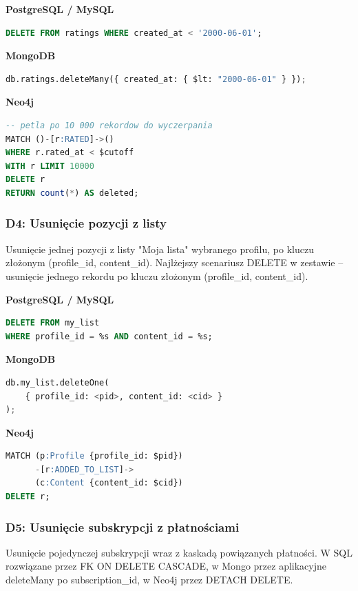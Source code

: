 \textbf{PostgreSQL / MySQL}
\begin{lstlisting}[language=SQL]
DELETE FROM ratings WHERE created_at < '2000-06-01';
\end{lstlisting}

\textbf{MongoDB}
\begin{lstlisting}[language=Python]
db.ratings.deleteMany({ created_at: { $lt: "2000-06-01" } });
\end{lstlisting}

\textbf{Neo4j}
\begin{lstlisting}[language=SQL]
-- petla po 10 000 rekordow do wyczerpania
MATCH ()-[r:RATED]->()
WHERE r.rated_at < $cutoff
WITH r LIMIT 10000
DELETE r
RETURN count(*) AS deleted;
\end{lstlisting}


\subsubsection{D4: Usunięcie pozycji z listy}

Usunięcie jednej pozycji z listy "Moja lista" wybranego profilu, po kluczu
złożonym (profile\_id, content\_id). Najlżejszy scenariusz DELETE w zestawie -- usunięcie jednego rekordu
po kluczu złożonym (profile\_id, content\_id).

\textbf{PostgreSQL / MySQL}
\begin{lstlisting}[language=SQL]
DELETE FROM my_list
WHERE profile_id = %s AND content_id = %s;
\end{lstlisting}

\textbf{MongoDB}
\begin{lstlisting}[language=Python]
db.my_list.deleteOne(
    { profile_id: <pid>, content_id: <cid> }
);
\end{lstlisting}

\textbf{Neo4j}
\begin{lstlisting}[language=SQL]
MATCH (p:Profile {profile_id: $pid})
      -[r:ADDED_TO_LIST]->
      (c:Content {content_id: $cid})
DELETE r;
\end{lstlisting}


\subsubsection{D5: Usunięcie subskrypcji z płatnościami}

Usunięcie pojedynczej subskrypcji wraz z kaskadą powiązanych płatności.
W SQL rozwiązane przez FK ON DELETE CASCADE, w Mongo przez aplikacyjne
deleteMany po subscription\_id, w Neo4j przez DETACH DELETE.

